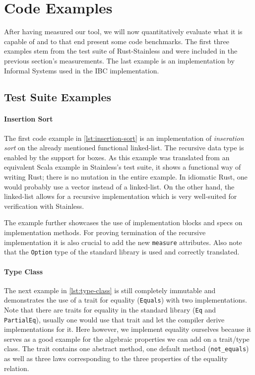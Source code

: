 


\section{Code Examples}

After having measured our tool, we will now quantitatively evaluate what it is
capable of and to that end present some code benchmarks. The first three
examples stem from the test suite of Rust-Stainless and were included in the
previous section's measurements. The last example is an implementation by
Informal Systems used in the IBC implementation.

\subsection{Test Suite Examples}

\paragraph{Insertion Sort}

The first code example in \autoref{lst:insertion-sort} is an implementation of
\emph{inseration sort} on the already mentioned functional linked-list. The
recursive data type is enabled by the support for boxes. As this example was
translated from an equivalent Scala example in Stainless's test suite, it shows a
functional way of writing Rust; there is no mutation in the entire example. In
idiomatic Rust, one would probably use a vector instead of a linked-list. On the
other hand, the linked-list allows for a recursive implementation which is very
well-suited for verification with Stainless.

The example further showcases the use of implementation blocks and specs on
implementation methods. For proving termination of the recursive implementation
it is also crucial to add the new \lstinline!measure! attributes. Also note that
the \lstinline!Option! type of  the standard library is used and correctly
translated.

\paragraph{Type Class}

The next example in \autoref{lst:type-class} is still completely immutable and
demonstrates the use of a trait for equality (\lstinline!Equals!) with two
implementations. Note that there are traits for equality in the standard library
(\lstinline!Eq! and \lstinline!PartialEq!), usually one would use that trait and
let the compiler derive implementations for it. Here however, we implement
equality ourselves because it serves as a good example for the algebraic
properties we can add on a trait/type class. The trait contains one abstract
method, one default method (\lstinline!not_equals!) as well as three laws
corresponding to the three properties of the equality relation.


